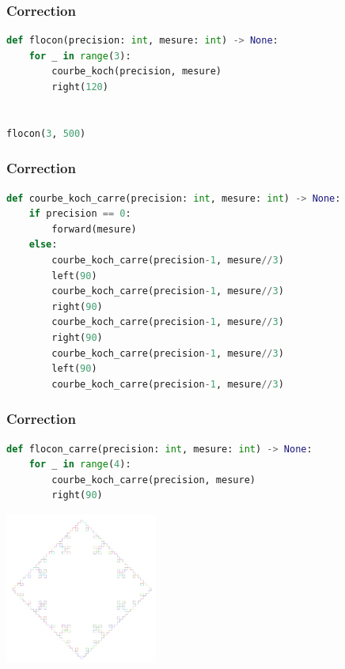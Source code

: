 \documentclass[svgnames,11pt]{beamer}
\begin{document}
\begin{frame}[fragile]
    \frametitle{Correction}

    \begin{center}
    \begin{lstlisting}[language=Python , basicstyle=\ttfamily\small, xleftmargin=1em, xrightmargin=1em]
def flocon(precision: int, mesure: int) -> None:
    for _ in range(3):
        courbe_koch(precision, mesure)
        right(120)


flocon(3, 500)
\end{lstlisting}
    \label{CODE}
    \end{center}

\end{frame}
\begin{frame}[fragile]
    \frametitle{Correction}

    \begin{center}
    \begin{lstlisting}[language=Python , basicstyle=\ttfamily\small, xleftmargin=1em, xrightmargin=1em]
def courbe_koch_carre(precision: int, mesure: int) -> None:
    if precision == 0:
        forward(mesure)
    else:
        courbe_koch_carre(precision-1, mesure//3)
        left(90)
        courbe_koch_carre(precision-1, mesure//3)
        right(90)
        courbe_koch_carre(precision-1, mesure//3)
        right(90)
        courbe_koch_carre(precision-1, mesure//3)
        left(90)
        courbe_koch_carre(precision-1, mesure//3)
\end{lstlisting}
    \label{CODE}
    \end{center}

\end{frame}
\begin{frame}[fragile]
    \frametitle{Correction}

    \begin{center}
    \begin{lstlisting}[language=Python , basicstyle=\ttfamily\small, xleftmargin=1em, xrightmargin=1em]
def flocon_carre(precision: int, mesure: int) -> None:
    for _ in range(4):
        courbe_koch_carre(precision, mesure)
        right(90)
\end{lstlisting}
    \end{center}
\begin{center}
\centering
\includegraphics[width=5cm]{ressources/quadratique.png}
\end{center}
\end{frame}
\end{document}
